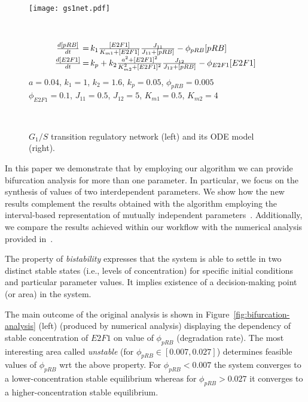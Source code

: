 \documentclass{llncs}
\begin{document}
\begin{figure}[b]
\vspace*{-7mm}
  \begin{center}
\hspace*{-6mm}\parbox{3.8cm}{\texttt{[image: gs1net.pdf]}}~\hspace*{6mm}
\parbox{6.7cm}{
\scriptsize
$$\begin{array}{c@{$\,=\,$}l}
\frac{d[pRB]}{dt} & k_1 \frac{[E2F1]}{K_{m1}+[E2F1]}\frac{J_{11}}{J_{11}+[pRB]}  - \phi_{pRB}[pRB]\\[1mm]
\frac{d[E2F1]}{dt} & k_p + k_2 \frac{a^2+[E2F1]^2}{K_{m2}^2+[E2F1]^2}\frac{J_{12}}{J_{12}+[pRB]} - \phi_{E2F1} [E2F1]
\end{array}$$
$a = 0.04$, $k_1=1$, $k_2=1.6$, $k_p=0.05$, $\phi_{pRB}=0.005$ \\$\phi_{E2F1}=0.1$, $J_{11}=0.5$, $J_{12}=5$, $K_{m1}=0.5$, $K_{m2}=4$\\
}\\
    \end{center}
    \vspace*{-4mm}
\caption{$G_1/S$ transition regulatory network (left) and its ODE model (right).}
\label{fig:genmodel}
\end{figure}

In this paper we demonstrate that by employing our algorithm we can provide bifurcation analysis for more than one parameter.
In particular, we focus on the synthesis of values of two interdependent parameters. We show how the new results complement the results obtained with the algorithm employing the interval-based representation of mutually independent parameters~\cite{CMSB15}. Additionally, we compare the results achieved within our workflow with the numerical analysis provided in~\cite{SKH04}. 

The property of {\em bistability} expresses that the system is able to settle in two distinct stable states (i.e., levels of concentration) for specific initial conditions and particular parameter values. It implies existence of a decision-making point (or area) in the system. %

The main outcome of the original analysis is shown in Figure~\ref{fig:bifurcation-analysis} (left) (produced by numerical analysis) displaying the dependency of stable concentration of $E2F1$ on value of $\phi_{pRB}$ (degradation rate). The most interesting area called {\em unstable} (for $\phi_{pRB} \in [0.007,0.027]$) 
determines feasible values of $\phi_{pRB}$ wrt the above property.  For $\phi_{pRB}<0.007$ the system converges to a lower-concentration stable equilibrium whereas for
$\phi_{pRB}>0.027$ it converges to a higher-concentration stable equilibrium.
\end{document}
